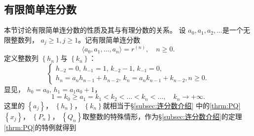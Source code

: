 \subsection{有限简单连分数}
\setcounter{equation}{0}
\setcounter{theorem}{0}
本节讨论有限简单连分数的性质及其与有理分数的关系。
设 \( a_0, a_1, a_2, \dots \)是一个无限整数列， \( a_j \ge 1, j \ge 1 \)。记有限简单连分数
\begin{equation}
	\langle a_0, a_1, \dots, a_n \rangle = r^{(n)}, \quad n \ge 0. \label{eq:有限简单连分数}
\end{equation}
定义整数列 \( \left\{ h_n\right\} \)与 	\( \left\{k_n\right\} \)：
\begin{equation}\label{eq:hk定义}
	\begin{cases}
		h_{-2} = 0,\, h_{-1} = 1,\, k_{-2} - 1,\, k_{-1} = 0, \\
		h_n = a_nh_{n-1} + h_{n-2},\, k_n = a_nk_{n-1} + k_{n-2}, n \ge 0 .
	\end{cases}
\end{equation}
显见， \( h_0 = a_0,\, h_1 = a_1a_0 + 1 \)，
\begin{equation}
	1 = k_0 \ge a_1 = k_1 < k_2 < \dots < k_n < \dots, \quad k_n \to + \infty .
\end{equation}
这里的 \( \left\{ a_j \right\} \)， \(\left\{ h_n \right\}\)， \(\left\{ k_n
\right\}\)就相当于\S\ref{subsec:连分数介绍} 中的\eqref{thrm:PQ} \(\left\{ x_j \right\}\)， \(\left\{ P_n \right\}\)，
\(\left\{ Q_n \right\}\)取整数的特殊情形，作为\S\ref{subsec:连分数介绍}的定理\ref{thrm:PQ}的特例就得到
